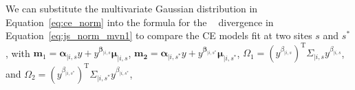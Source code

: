 \documentclass[
  12pt]{article}
\newcommand{\JSGa}{\mathop{\mathrm{JS}^{\mathrm{G}_{\lambda}}}\nolimits}
\newcommand{\cJSGa}[1]{\mathop{\mathrm{cJS}_{i, #1}^{\mathrm{G}_{\lambda}}}\nolimits}
\newcommand\numberthis{\addtocounter{equation}{1}\tag{\theequation}}
\newcommand{\mvmean}[1]{\symbf{\alpha}_{\mid i, #1} y + y^{\symbf{\beta}_{\mid i, #1}} \symbf{\mu}_{\mid i, #1}}
\newcommand{\mvcov}[1]{\left(y^{\beta_{\mid i, #1}}\right)^{\mathrm{T}} \Sigma_{\mid i, #1} y^{\beta_{\mid i, #1}}}
\begin{document}
We can substitute the multivariate Gaussian distribution in Equation~\eqref{eq:ce_norm} into the formula for the $\JSGa{}$ divergence in Equation~\eqref{eq:js_norm_mvn1} to compare the CE models fit at two sites $s$ and $s^*$, with 
$\symbf{m}_1 = \mvmean{s}$, 
$\symbf{m_2} = \mvmean{s^*}$, 
$\Omega_1 = \mvcov{s}$, and
$\Omega_2 = \mvcov{s^*}$, 
\end{document}
